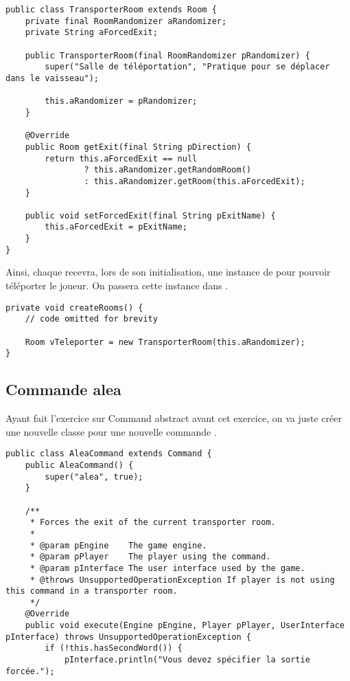 \begin{exercise}[subtitle=Transporter]
\begin{verbatim}
public class TransporterRoom extends Room {
    private final RoomRandomizer aRandomizer;
    private String aForcedExit;

    public TransporterRoom(final RoomRandomizer pRandomizer) {
        super("Salle de téléportation", "Pratique pour se déplacer dans le vaisseau");

        this.aRandomizer = pRandomizer;
    }

    @Override
    public Room getExit(final String pDirection) {
        return this.aForcedExit == null
                ? this.aRandomizer.getRandomRoom()
                : this.aRandomizer.getRoom(this.aForcedExit);
    }

    public void setForcedExit(final String pExitName) {
        this.aForcedExit = pExitName;
    }
}
\end{verbatim}

Ainsi, chaque  recevra, lors de son initialisation, une instance de  pour pouvoir téléporter le joueur. On passera cette instance dans .

\begin{verbatim}
private void createRooms() {
    // code omitted for brevity

    Room vTeleporter = new TransporterRoom(this.aRandomizer);
}
\end{verbatim}

\subsection*{Commande alea}

Ayant fait l'exercice sur Command abstract avant cet exercice, on va juste créer une nouvelle classe pour une nouvelle commande .

\begin{verbatim}
public class AleaCommand extends Command {
    public AleaCommand() {
        super("alea", true);
    }

    /**
     * Forces the exit of the current transporter room.
     *
     * @param pEngine    The game engine.
     * @param pPlayer    The player using the command.
     * @param pInterface The user interface used by the game.
     * @throws UnsupportedOperationException If player is not using this command in a transporter room.
     */
    @Override
    public void execute(Engine pEngine, Player pPlayer, UserInterface pInterface) throws UnsupportedOperationException {
        if (!this.hasSecondWord()) {
            pInterface.println("Vous devez spécifier la sortie forcée.");


\end{verbatim}
\end{exercise}
